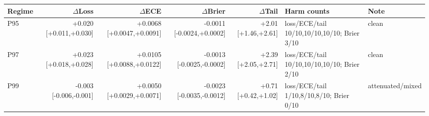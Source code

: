 \begin{tabular}{@{}lrrrrll@{}}
  \toprule
  Regime & $\Delta$Loss & $\Delta$ECE & $\Delta$Brier & $\Delta$Tail & Harm counts & Note \\
  \midrule
  P95 & +0.020 [+0.011,+0.030] & +0.0068 [+0.0047,+0.0091] & -0.0011 [-0.0024,+0.0002] & +2.01 [+1.46,+2.61] & loss/ECE/tail 10/10,10/10,10/10; Brier 3/10 & clean \\
  P97 & +0.023 [+0.018,+0.028] & +0.0105 [+0.0088,+0.0122] & -0.0013 [-0.0025,-0.0002] & +2.39 [+2.05,+2.71] & loss/ECE/tail 10/10,10/10,10/10; Brier 2/10 & clean \\
  P99 & -0.003 [-0.006,-0.001] & +0.0050 [+0.0029,+0.0071] & -0.0023 [-0.0035,-0.0012] & +0.71 [+0.42,+1.02] & loss/ECE/tail 1/10,8/10,8/10; Brier 0/10 & attenuated/mixed \\
  \bottomrule
\end{tabular}
